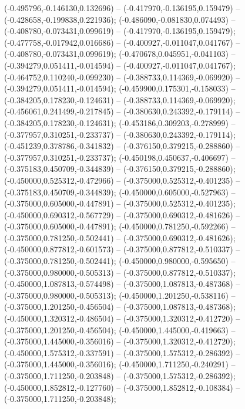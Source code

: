 (-0.495796,-0.146130,0.132696) -- (-0.417970,-0.136195,0.159479) -- (-0.428658,-0.199838,0.221936);
 (-0.486090,-0.081830,0.074493) -- (-0.408780,-0.073431,0.099619) -- (-0.417970,-0.136195,0.159479);
 (-0.477758,-0.017942,0.016686) -- (-0.400927,-0.011047,0.041767) -- (-0.408780,-0.073431,0.099619);
 (-0.470678,0.045951,-0.041103) -- (-0.394279,0.051411,-0.014594) -- (-0.400927,-0.011047,0.041767);
 (-0.464752,0.110240,-0.099230) -- (-0.388733,0.114369,-0.069920) -- (-0.394279,0.051411,-0.014594);
 (-0.459900,0.175301,-0.158033) -- (-0.384205,0.178230,-0.124631) -- (-0.388733,0.114369,-0.069920);
 (-0.456061,0.241499,-0.217845) -- (-0.380630,0.243392,-0.179114) -- (-0.384205,0.178230,-0.124631);
 (-0.453186,0.309203,-0.278999) -- (-0.377957,0.310251,-0.233737) -- (-0.380630,0.243392,-0.179114);
 (-0.451239,0.378786,-0.341832) -- (-0.376150,0.379215,-0.288860) -- (-0.377957,0.310251,-0.233737);
 (-0.450198,0.450637,-0.406697) -- (-0.375183,0.450709,-0.344839) -- (-0.376150,0.379215,-0.288860);
 (-0.450000,0.525312,-0.472966) -- (-0.375000,0.525312,-0.401235) -- (-0.375183,0.450709,-0.344839);
 (-0.450000,0.605000,-0.527963) -- (-0.375000,0.605000,-0.447891) -- (-0.375000,0.525312,-0.401235);
 (-0.450000,0.690312,-0.567729) -- (-0.375000,0.690312,-0.481626) -- (-0.375000,0.605000,-0.447891);
 (-0.450000,0.781250,-0.592266) -- (-0.375000,0.781250,-0.502441) -- (-0.375000,0.690312,-0.481626);
 (-0.450000,0.877812,-0.601573) -- (-0.375000,0.877812,-0.510337) -- (-0.375000,0.781250,-0.502441);
 (-0.450000,0.980000,-0.595650) -- (-0.375000,0.980000,-0.505313) -- (-0.375000,0.877812,-0.510337);
 (-0.450000,1.087813,-0.574498) -- (-0.375000,1.087813,-0.487368) -- (-0.375000,0.980000,-0.505313);
 (-0.450000,1.201250,-0.538116) -- (-0.375000,1.201250,-0.456504) -- (-0.375000,1.087813,-0.487368);
 (-0.450000,1.320312,-0.486504) -- (-0.375000,1.320312,-0.412720) -- (-0.375000,1.201250,-0.456504);
 (-0.450000,1.445000,-0.419663) -- (-0.375000,1.445000,-0.356016) -- (-0.375000,1.320312,-0.412720);
 (-0.450000,1.575312,-0.337591) -- (-0.375000,1.575312,-0.286392) -- (-0.375000,1.445000,-0.356016);
 (-0.450000,1.711250,-0.240291) -- (-0.375000,1.711250,-0.203848) -- (-0.375000,1.575312,-0.286392);
 (-0.450000,1.852812,-0.127760) -- (-0.375000,1.852812,-0.108384) -- (-0.375000,1.711250,-0.203848);
